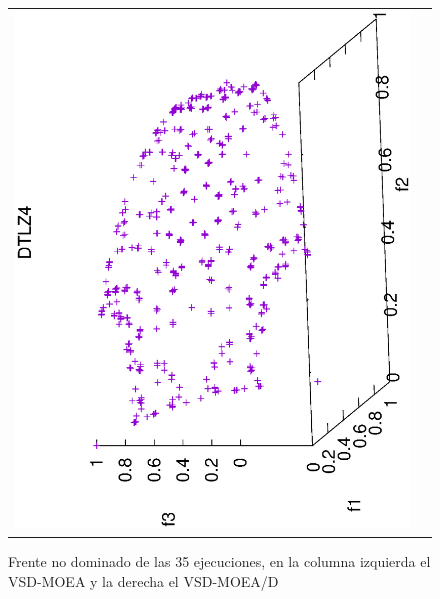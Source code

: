 \begin{figure}[H]
\centering
\scriptsize
\caption{Frente no dominado de las 35 ejecuciones, en la columna izquierda el VSD-MOEA y la derecha el VSD-MOEA/D}%
\begin{tabular}{cc}
 \includegraphics[scale=0.3, angle=-90,origin=c]{Figures_Chapter7/Results_Chapter4/Summary_Representative/VSD-MOEA/DTLZ4.eps} &

\end{tabular}
\end{figure}
